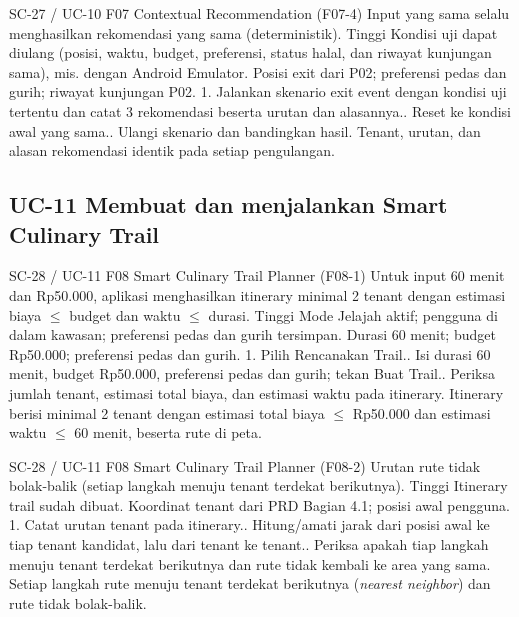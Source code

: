 \renewcommand{\tcactual}{Sesuai ekspektasi pada perangkat Android (Lolos via \texttt{05-recommendation} (10/10) \& \texttt{recommendation.test} (10/10)). Tenant, urutan, dan alasan rekomendasi identik pada setiap pengulangan.}
{SC-27 / UC-10}
{F07 Contextual Recommendation}
{(F07-4) Input yang sama selalu menghasilkan rekomendasi yang sama (deterministik).}
{Tinggi}
{Kondisi uji dapat diulang (posisi, waktu, budget, preferensi, status halal, dan riwayat kunjungan sama), mis. dengan Android Emulator.}
{Posisi exit dari P02; preferensi pedas dan gurih; riwayat kunjungan P02.}
{1. Jalankan skenario exit event dengan kondisi uji tertentu dan catat 3 rekomendasi beserta urutan dan alasannya.. Reset ke kondisi awal yang sama.. Ulangi skenario dan bandingkan hasil.}
{Tenant, urutan, dan alasan rekomendasi identik pada setiap pengulangan.}

\subsection*{UC-11 Membuat dan menjalankan Smart Culinary Trail}

\renewcommand{\tcactual}{Sesuai ekspektasi pada perangkat Android (Lolos via \texttt{06-trail} (8/8) \& \texttt{trail.test} (9/9)). Itinerary berisi minimal 2 tenant dengan estimasi total biaya \(\le\) Rp50.000 dan estimasi waktu \(\le\) 60 menit, beserta rute di peta.}
{SC-28 / UC-11}
{F08 Smart Culinary Trail Planner}
{(F08-1) Untuk input 60 menit dan Rp50.000, aplikasi menghasilkan itinerary minimal 2 tenant dengan estimasi biaya \(\le\) budget dan waktu \(\le\) durasi.}
{Tinggi}
{Mode Jelajah aktif; pengguna di dalam kawasan; preferensi pedas dan gurih tersimpan.}
{Durasi 60 menit; budget Rp50.000; preferensi pedas dan gurih.}
{1. Pilih Rencanakan Trail.. Isi durasi 60 menit, budget Rp50.000, preferensi pedas dan gurih; tekan Buat Trail.. Periksa jumlah tenant, estimasi total biaya, dan estimasi waktu pada itinerary.}
{Itinerary berisi minimal 2 tenant dengan estimasi total biaya \(\le\) Rp50.000 dan estimasi waktu \(\le\) 60 menit, beserta rute di peta.}

\renewcommand{\tcactual}{Sesuai ekspektasi pada perangkat Android (Lolos via \texttt{06-trail} (8/8) \& \texttt{trail.test} (9/9)). Setiap langkah rute menuju tenant terdekat berikutnya (\textit{nearest neighbor}) dan rute tidak bolak-balik.}
{SC-28 / UC-11}
{F08 Smart Culinary Trail Planner}
{(F08-2) Urutan rute tidak bolak-balik (setiap langkah menuju tenant terdekat berikutnya).}
{Tinggi}
{Itinerary trail sudah dibuat.}
{Koordinat tenant dari PRD Bagian 4.1; posisi awal pengguna.}
{1. Catat urutan tenant pada itinerary.. Hitung/amati jarak dari posisi awal ke tiap tenant kandidat, lalu dari tenant ke tenant.. Periksa apakah tiap langkah menuju tenant terdekat berikutnya dan rute tidak kembali ke area yang sama.}
{Setiap langkah rute menuju tenant terdekat berikutnya (\textit{nearest neighbor}) dan rute tidak bolak-balik.}

